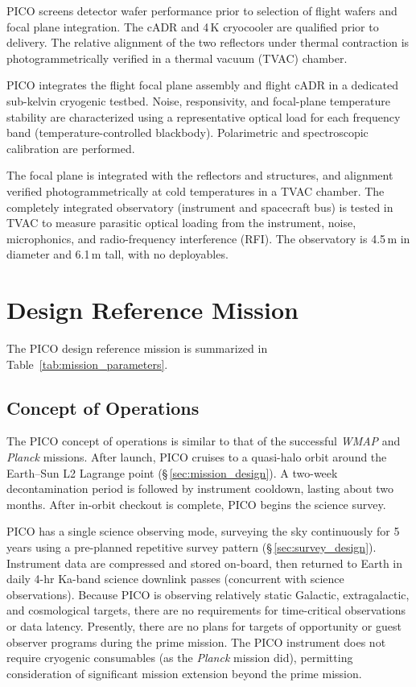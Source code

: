 PICO screens detector wafer performance prior to selection of
flight wafers and focal plane integration. The cADR and 4\,K
cryocooler are qualified prior to delivery. The relative alignment
of the two reflectors under thermal contraction is
photogrammetrically verified in a thermal vacuum (TVAC) chamber.

PICO integrates the flight focal plane assembly and flight cADR in
a dedicated sub-kelvin cryogenic testbed. Noise, responsivity, and focal-plane
temperature stability are characterized using a representative
optical load for each frequency band (temperature-controlled
blackbody). Polarimetric and spectroscopic calibration are
performed.

The focal plane is integrated with the reflectors and structures, and
alignment verified photogrammetrically at cold temperatures in a TVAC
chamber.  The completely integrated observatory (instrument and
spacecraft bus) is tested in TVAC to measure parasitic optical loading
from the instrument, noise, microphonics, and radio-frequency
interference (RFI). The observatory is 4.5\,m in diameter and 6.1\,m
tall, with no deployables.

\section{Design Reference Mission}
\label{sec:design_reference} %
The PICO design reference mission is summarized in Table~\ref{tab:mission_parameters}.

\subsection{Concept of Operations}
\label{sec:operations} %
%

%
The PICO concept of operations is similar to that of the successful
\textit{WMAP} \citep{Bennett2003} and \textit{Planck} \citep{Tauber2010} missions. After launch,
PICO cruises to a quasi-halo orbit around the Earth--Sun L2 Lagrange point
(\S\,\ref{sec:mission_design}). A two-week decontamination period is followed by
instrument cooldown, lasting about two months. After in-orbit checkout is complete, PICO begins
the science survey.

PICO has a single science observing mode, surveying the sky
continuously for 5 years using a pre-planned repetitive survey pattern
(\S\,\ref{sec:survey_design}). Instrument data are compressed and stored on-board, then
returned to Earth in daily 4-hr Ka-band science downlink passes
(concurrent with science observations). Because PICO is observing
relatively static Galactic, extragalactic, and cosmological targets,
there are no requirements for time-critical observations or data
latency. Presently, there are no plans for targets of opportunity or
guest observer programs during the prime mission. The PICO instrument
does not require cryogenic consumables (as the \textit{Planck} mission did),
permitting consideration of significant mission extension beyond the prime
mission.



